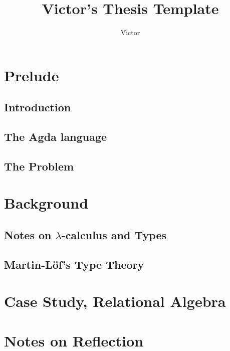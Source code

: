 \documentclass{report}
\title{Victor's Thesis Template}
\author{Victor}
\begin{document}
\maketitle
\tableofcontents

\theoremstyle{plain}
\newtheorem{thm}{Theorem}[chapter]
\newtheorem{crl}{Corolary}[chapter]
\newtheorem{prob}{Problem}[chapter]
\newtheorem{prop}{Proposition}[chapter]

\theoremstyle{definition}
\newtheorem{lemma}{Lemma}[chapter]
\newtheorem{mydef}{Definition}[chapter]
\newtheorem{notation}{Notation}[chapter]

\theoremstyle{remark}
\newtheorem{nota}{Note}[chapter]

\chapter{Prelude}
\label{chap:prelude}

  \section{Introduction}
  \label{sec:prelude:introduction}
  
  
  \section{The Agda language}
  \label{sec:prelude:agdalanguage}
  
  
  \section{The Problem}
  \label{sec:prelude:theproblem}
  
  
\chapter{Background}
\label{chap:background}


  \section{Notes on $\lambda$-calculus and Types}
  \label{sec:background:lambdacalculus}
  
  
  \section{Martin-Löf's Type Theory}
  \label{sec:background:martinlof}
  
  
\chapter{Case Study, Relational Algebra}
\label{chap:relationalalgebra}

  
\chapter{Notes on Reflection}
\label{chap:reflection}





\end{document}

